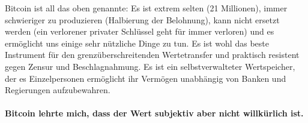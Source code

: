 Bitcoin ist all das oben genannte: Es ist extrem selten (21 Millionen), immer
schwieriger zu produzieren (Halbierung der Belohnung), kann nicht ersetzt werden
(ein verlorener privater Schlüssel geht für immer verloren) und es ermöglicht
uns einige sehr nützliche Dinge zu tun. Es ist wohl das beste Instrument für den
grenzüberschreitenden Wertetransfer und praktisch resistent gegen Zensur und
Beschlagnahmung. Es ist ein selbstverwalteter Wertspeicher, der es
Einzelpersonen ermöglicht ihr Vermögen unabhängig von Banken und Regierungen
aufzubewahren.

\paragraph{Bitcoin lehrte mich, dass der Wert subjektiv aber nicht willkürlich ist.}

%
%
%
%
